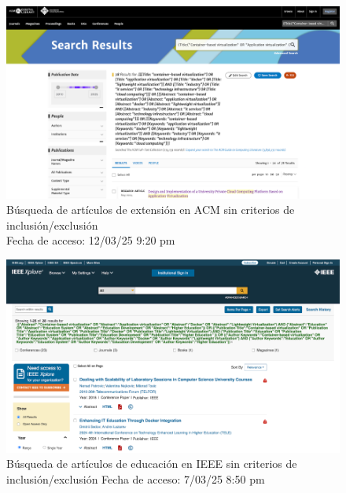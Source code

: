 \FloatBarrier\begin{figure}[htbp]
    \centering
    \includegraphics[width=\textwidth,keepaspectratio]{apendices/BD/sin-criterios/ACM-ind.png}
    \caption{Búsqueda de artículos de extensión en ACM sin criterios de inclusión/exclusión \\
    Fecha de acceso: 12/03/25 9:20 pm
    }\label{fig:busqueda3}
\end{figure}
\FloatBarrier\begin{figure}[htbp]
    \centering
    \includegraphics[width=\textwidth,keepaspectratio]{apendices/BD/sin-criterios/IEEE-ed.png}
    \caption{Búsqueda de artículos de educación en IEEE sin criterios de inclusión/exclusión
    Fecha de acceso: 7/03/25 8:50 pm
    }\label{fig:busqueda4}
\end{figure}
